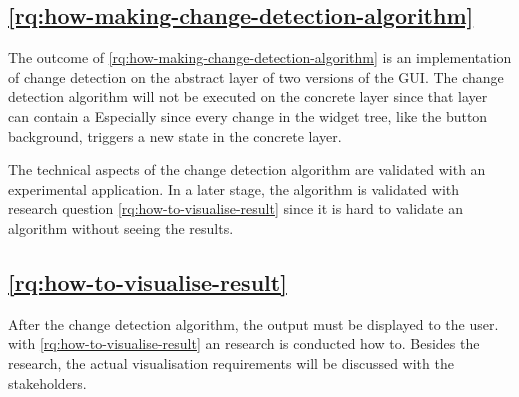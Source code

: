 \subsection{\ref{rq:how-making-change-detection-algorithm} \rqHowMakingChangeDetectionAlgorithm}

The outcome of \ref{rq:how-making-change-detection-algorithm} is an implementation of change detection on the abstract layer of two versions of the GUI. The change detection algorithm will not be executed on the concrete layer since that layer can contain a 
Especially since every change in the widget tree, like the button background, triggers a new state in the concrete layer. 

The technical aspects of the change detection algorithm are validated with an experimental application. In a later stage, the algorithm is validated with research question \ref{rq:how-to-visualise-result} since it is hard to validate an algorithm without seeing the results. 

\subsection{\ref{rq:how-to-visualise-result} \rqHowToVisualiseResult}

After the change detection algorithm, the output must be displayed to the user. with \ref{rq:how-to-visualise-result} an research is conducted how to. Besides the research, the actual visualisation requirements will be discussed with the \testar stakeholders.